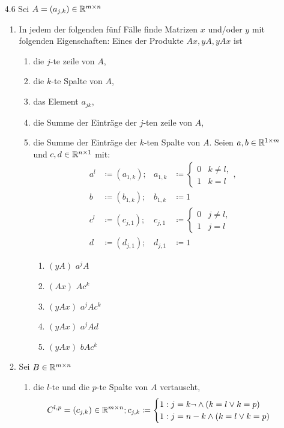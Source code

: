 \documentclass{HM}
\begin{document}
\begin{enumerate}
\begin{enumerate}
\end{enumerate}
\item [4.6] Sei $A=(a_{j,k})\in\R^{m\times n}$
\begin{enumerate}
\item In jedem der folgenden fünf Fälle finde Matrizen $x$ und/oder $y$ mit folgenden Eigenschaften: Eines der Produkte $Ax, yA, yAx$ ist
\begin{enumerate}
\item die $j$-te zeile von $A$,
\item die $k$-te Spalte von $A$,
\item das Element $a_{jk}$,
\item die Summe der Einträge der $j$-ten zeile von $A$,
\item die Summe der Einträge der $k$-ten Spalte von $A$.
Seien $a,b\in\R^{1\times m}$ und $c,d\in\R^{n\times 1}$ mit:
\begin{align*}
a^l&\coloneqq (a_{1,k}); &a_{1,k}&\coloneqq\begin{cases}
0 &k\neq l,\\
1 &k=l 
\end{cases},\\
b&\coloneqq (b_{1,k}); &b_{1,k}&\coloneqq 1\\
c^l&\coloneqq (c_{j,1}); &c_{j,1}&\coloneqq \begin{cases}
0 &j\neq l,\\
1 &j=l
\end{cases}\\
d&\coloneqq (d_{j,1}); &d_{j,1}&\coloneqq 1
\end{align*}
\begin{enumerate}
\item $(yA)$  $a^jA$
\item $(Ax)$  $Ac^k$
\item $(yAx)$ $a^jAc^k$
\item $(yAx)$ $a^jAd$
\item $(yAx)$ $bAc^k$
\end{enumerate}
\end{enumerate}
\item Sei $B\in\R^{m\times n}$
\begin{enumerate}
\item die $l$-te und die $p$-te Spalte von $A$ vertauscht,\\
$$C^{l,p} = (c_{j,k}) \in \R^{m\times n}; c_{j,k} \coloneqq \begin{cases}
	1: j=k \lnot\land (k=l \lor k=p)\\
	1: j=n-k \land (k=l \lor k=p) \\

\end{cases}$$
\end{enumerate}
\end{enumerate}
\end{enumerate}
\end{document}
